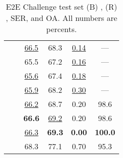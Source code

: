\begin{table}[p]
\begin{minipage}[t]{0.45\linewidth}
{\begin{tabular}{ll cccc}
    \midrule
    \parbox[t]{2mm}{}
     &   & \uline{66.5} & 68.3 & \uline{0.14} & --- \\
     &   & 65.5 & 67.2 & \uline{0.16} & --- \\
     &   & \uline{65.6} & 67.4 & \uline{0.18} & --- \\
     &   & \uline{65.9} & 68.2 & \uline{0.30} & --- \\
     &   & \uline{66.2} & 68.7 & 0.20 & 98.6 \\
     &   & \textbf{66.6} & \uline{69.2} & 0.20 & 98.6 \\
     &   & \uline{66.3} & \textbf{69.3} & \textbf{0.00} & \textbf{100.0} \\
     &   & 68.3 & 77.1 & 0.70 & 95.3 \\
    \bottomrule
\end{tabular}}
\caption{E2E Challenge test set (B) \bleu, (R) \rougel, SER, and OA. All numbers are percents. }
\label{tab:main.e2e.test}
\end{minipage}\hfill \begin{minipage}[t]{0.45\linewidth}


\end{minipage}
\end{table}

